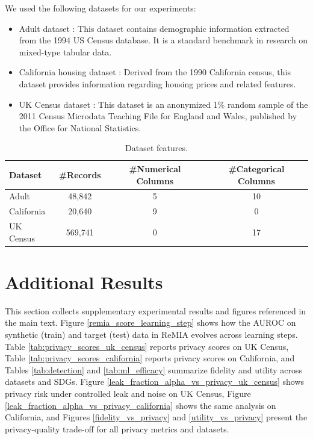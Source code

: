 \label{app:datasets}
We used the following datasets for our experiments:
\begin{itemize}
  \item Adult dataset \citep{adult}: This dataset contains demographic information extracted from the 1994 US Census database. It is a standard benchmark in research on mixed-type tabular data.
  \item California housing dataset \citep{california}: Derived from the 1990 California census, this dataset provides information regarding housing prices and related features.
  \item UK Census dataset \citep{uk_census}: This dataset is an anonymized 1\% random sample of the 2011 Census Microdata Teaching File for England and Wales, published by the Office for National Statistics.
\end{itemize}
\begin{table}[h]
  \centering
  \caption{Dataset features.}
  \begin{tabular}{lccc}
    \toprule
    Dataset & \#Records & \#Numerical Columns & \#Categorical Columns \\
    \midrule
    Adult & 48,842 & 5 & 10 \\
    California & 20,640 & 9 & 0 \\
    UK Census & 569,741 & 0 & 17 \\
    \bottomrule
  \end{tabular}
  \label{tab:dataset_summary}
\end{table}







\section{Additional Results}
\label{app:additional_results}

This section collects supplementary experimental results and figures referenced in the main text.
Figure \ref{remia_score_learning_step} shows how the AUROC on synthetic (train) and target (test) data in ReMIA evolves across learning steps.
Table \ref{tab:privacy_scores_uk_census} reports privacy scores on UK Census, Table \ref{tab:privacy_scores_california} reports privacy scores on California, and Tables \ref{tab:detection} and \ref{tab:ml_efficacy} summarize fidelity and utility across datasets and SDGs. Figure \ref{leak_fraction_alpha_vs_privacy_uk_census} shows privacy risk under controlled leak and noise on UK Census, Figure \ref{leak_fraction_alpha_vs_privacy_california} shows the same analysis on California, and Figures \ref{fidelity_vs_privacy} and \ref{utility_vs_privacy} present the privacy-quality trade-off for all privacy metrics and datasets.

